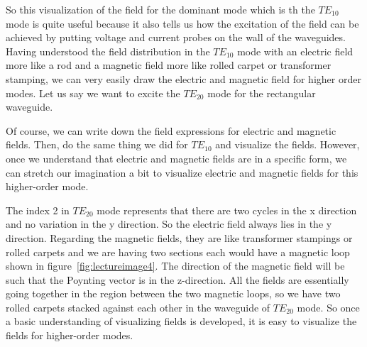 So this visualization of the field for the dominant mode which is th the $TE_{10}$ mode is quite useful because it also tells us how the excitation of the field can be achieved by putting voltage and current probes on the wall of the waveguides. Having understood the field distribution in the  $TE_{10}$ mode with an electric field more like a rod and a magnetic field more like rolled carpet or transformer stamping, we can very easily draw the electric and magnetic field for higher order modes. Let us say we want to excite the $TE_{20}$ mode for the rectangular waveguide.

Of course, we can write down the field expressions for electric and magnetic fields. Then, do the same thing we did for $TE_{10}$ and visualize the fields. However, once we understand that electric and magnetic fields are in a specific form, we can stretch our imagination a bit to visualize electric and magnetic fields for this higher-order mode.

The index 2 in $TE_{20}$ mode represents that there are two cycles in the x direction and no variation in the y direction. So the electric field always lies in the y direction. Regarding the magnetic fields, they are like transformer stampings or rolled carpets and we are having two sections each would have a magnetic loop shown in figure~\ref{fig:lectureimage4}. The direction of the magnetic field will be such that the Poynting vector is in the z-direction. All the fields are essentially going together in the region between the two magnetic loops, so we have two rolled carpets stacked against each other in the waveguide of $TE_{20}$ mode. So once a basic understanding of visualizing fields is developed, it is easy to visualize the fields for higher-order modes. 

